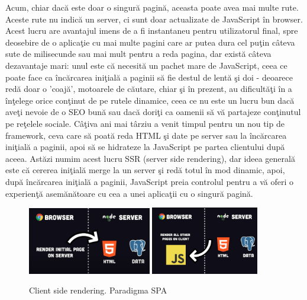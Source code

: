 \documentclass[12pt, a4paper]{report}
\begin{document}
Acum, chiar dac\u a este doar o singur\u a pagin\u a, aceasta poate avea mai multe rute. Aceste rute nu indic\u a un server, ci sunt doar actualizate de JavaScript \^ in browser. Acest lucru are avantajul imens de a fi instantaneu pentru utilizatorul final, spre deosebire de o aplica\c tie cu mai multe pagini care ar putea dura cel pu\c tin c\^ ateva sute de milisecunde sau mai mult pentru a reda pagina, dar exist\u a c\^ ateva dezavantaje mari: unul este c\u a necesit\u a un pachet mare de JavaScript, ceea ce poate face ca \^ inc\u arcarea ini\c tial\u a a paginii s\u a fie destul de lent\u a \c si doi - deoarece red\u a doar o 'coaj\u a', motoarele de c\u autare, chiar \c si \^ in prezent, au dificult\u a\c ti \^ in a \^ in\c telege orice con\c tinut de pe rutele dinamice, ceea ce nu este un lucru bun dac\u a ave\c ti nevoie de o SEO bun\u a sau dac\u a dori\c ti ca oamenii s\u a v\u a partajeze con\c tinutul pe re\c telele sociale. C\^ a\c tiva ani mai t\^ arziu a venit timpul pentru un nou tip de framework, ceva care s\u a poat\u a reda HTML \c si date pe server sau la \^ inc\u arcarea ini\c tial\u a a paginii, apoi s\u a se hidrateze la JavaScript pe partea clientului dup\u a aceea. Ast\u azi numim acest lucru SSR (server side rendering), dar ideea general\u a este c\u a cererea ini\c tial\u a merge la un server \c si red\u a totul \^ in mod dinamic, apoi, dup\u a \^ inc\u arcarea ini\c tial\u a a paginii, JavaScript preia controlul pentru a v\u a oferi o experien\c t\u a asem\u an\u atoare cu cea a unei aplica\c tii cu o singur\u a pagin\u a.

\begin{figure}[htbp]
	\centering
	\includegraphics[width=0.48\textwidth]{39.png}
	\includegraphics[width=0.42\textwidth]{40.png}
	\caption{Client side rendering. Paradigma SPA}
	\label{fig:server rendering with hydration}
\end{figure}
\end{document}
